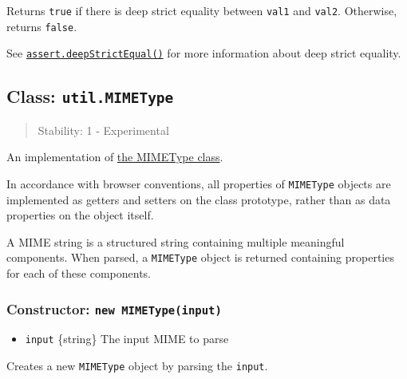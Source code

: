Returns \texttt{true} if there is deep strict equality between
\texttt{val1} and \texttt{val2}. Otherwise, returns \texttt{false}.

See
\href{assert.md\#assertdeepstrictequalactual-expected-message}{\texttt{assert.deepStrictEqual()}}
for more information about deep strict equality.

\subsection{\texorpdfstring{Class:
\texttt{util.MIMEType}}{Class: util.MIMEType}}\label{class-util.mimetype}

\begin{quote}
Stability: 1 - Experimental
\end{quote}

An implementation of
\href{https://bmeck.github.io/node-proposal-mime-api/}{the MIMEType
class}.

In accordance with browser conventions, all properties of
\texttt{MIMEType} objects are implemented as getters and setters on the
class prototype, rather than as data properties on the object itself.

A MIME string is a structured string containing multiple meaningful
components. When parsed, a \texttt{MIMEType} object is returned
containing properties for each of these components.

\subsubsection{\texorpdfstring{Constructor:
\texttt{new\ MIMEType(input)}}{Constructor: new MIMEType(input)}}\label{constructor-new-mimetypeinput}

\begin{itemize}
\tightlist
\item
  \texttt{input} \{string\} The input MIME to parse
\end{itemize}

Creates a new \texttt{MIMEType} object by parsing the \texttt{input}.

\begin{Shaded}
\begin{Highlighting}[]
 \OperatorTok{;}

\OperatorTok{=}  \NormalTok{(}\NormalTok{)}\OperatorTok{;}
\end{Highlighting}
\end{Shaded}

